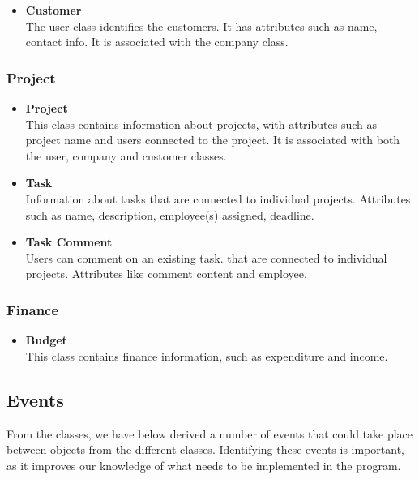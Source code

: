 \begin{itemize}
  
  \item \textbf{Customer} \\
  The user class identifies the customers. It has attributes such as name, contact info. It is associated with the company class.
\end{itemize}

\subsubsection*{Project}

\begin{itemize}
  \item \textbf{Project} \\
This class contains information about projects, with attributes such as project name and users connected to the project. It is associated with both the user, company and customer classes.
  \item \textbf{Task} \\
Information about tasks that are connected to individual projects. Attributes such as name, description, employee(s) assigned, deadline.
  \item \textbf{Task Comment} \\
Users can comment on an existing task. that are connected to individual projects. Attributes like comment content and employee.

\end{itemize}



\subsubsection*{Finance}

\begin{itemize}
  \item \textbf{Budget} \\
  This class contains finance information, such as expenditure and income. 
 

\end{itemize}

\subsection{Events}
From the classes, we have below derived a number of events that could take place between objects from the different classes. Identifying these events is important, as it improves our knowledge of what needs to be implemented in the program.

